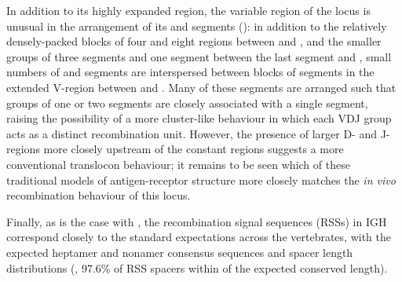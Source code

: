 In addition to its highly expanded \vh region, the variable region of the \Xma locus is unusual in the arrangement of its \dh and \jh segments (): in addition to the relatively densely-packed blocks of four \dh and eight \jh regions between  and , and the smaller groups of three \dh segments and one \jh segment between the last \vh segment and , small numbers of \dh and \jh segments are interspersed between blocks of \vh segments in the extended V-region between  and . Many of these segments are arranged such that groups of one or two \dh segments are closely associated with a single \jh segment, raising the possibility of a more cluster-like behaviour in which each VDJ group acts as a distinct recombination unit. However, the presence of larger D- and J-regions more closely upstream of the constant regions suggests a more conventional translocon behaviour; it remains to be seen which of these traditional models of antigen-receptor structure more closely matches the \textit{in vivo} recombination behaviour of this locus.
		
Finally, as is the case with \Nfu, the recombination signal sequences (RSSs) in \Xma IGH correspond closely to the standard expectations across the vertebrates, with the expected heptamer and nonamer consensus sequences and spacer length distributions (, 97.6\% of RSS spacers within  of the expected conserved length).	
	
